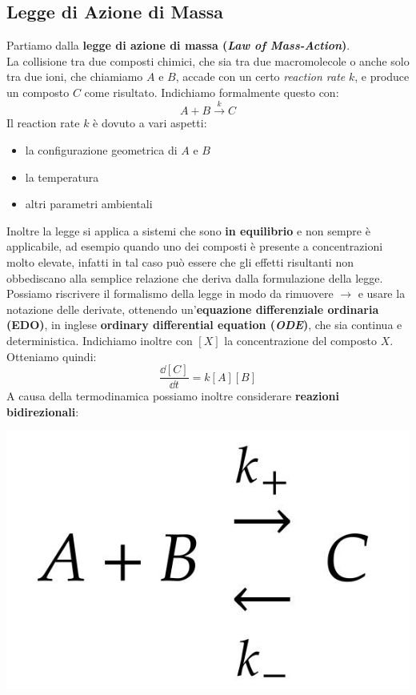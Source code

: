 \documentclass[a4paper,12pt, oneside]{book}
\begin{document}
\subsection{Legge di Azione di Massa}
Partiamo dalla \textbf{legge di azione di massa (\textit{Law of
    Mass-Action})}.\\
La collisione tra due composti chimici, che sia tra due macromolecole o anche
solo tra due ioni, che chiamiamo $A$ e $B$, accade con un certo \textit{reaction
rate} $k$, e produce un composto $C$ come risultato. Indichiamo formalmente
questo con:
\[A+B\stackrel{k}{\to}C\]
Il reaction rate $k$ è dovuto a vari aspetti:
\begin{itemize}
  \item la configurazione geometrica di $A$ e $B$
  \item la temperatura
  \item altri parametri ambientali
\end{itemize}
Inoltre la legge si applica a sistemi che sono \textbf{in equilibrio} e non
sempre è applicabile, ad esempio quando uno dei composti è presente a
concentrazioni molto elevate, infatti in tal caso può essere che gli effetti
risultanti non obbediscano alla semplice relazione che deriva dalla formulazione
della legge. \\
Possiamo riscrivere il formalismo della legge in modo da rimuovere $\to$ e
usare la notazione delle derivate, ottenendo un'\textbf{equazione differenziale
  ordinaria (EDO)}, in inglese \textbf{ordinary differential equation
  (\textit{ODE})}, che sia continua e deterministica. Indichiamo inoltre con
$[X]$ la concentrazione del composto $X$. Otteniamo quindi:
\[\frac{\dd{[C]}}{\dd{t}}=k[A][B]\]
A causa della termodinamica possiamo inoltre considerare \textbf{reazioni
  bidirezionali}:
\begin{center}
  \includegraphics[scale = 0.12]{img/equ.jpg}
\end{center}
\end{document}
